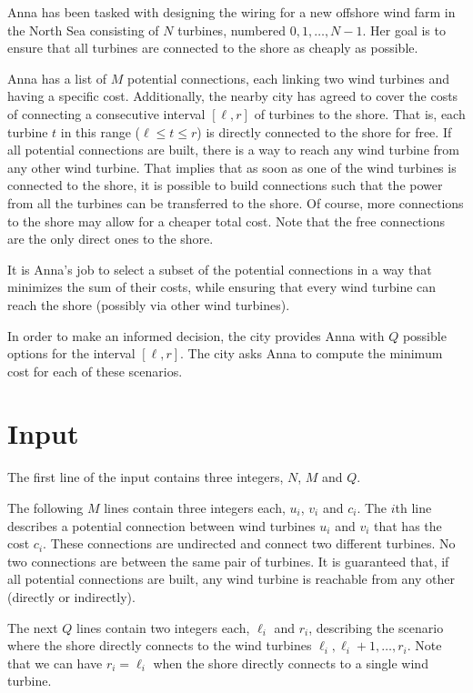 
Anna has been tasked with designing the wiring for a new offshore wind farm in the North Sea consisting of $N$ turbines, numbered $0, 1, \ldots, N-1$. Her goal is to ensure that all turbines are connected to the shore as cheaply as possible.

Anna has a list of $M$ potential connections, each linking two wind turbines and having a specific cost. Additionally, the nearby city has agreed to cover the costs of connecting a consecutive interval $[\ell, r]$ of turbines to the shore. That is, each turbine $t$ in this range ($\ell\le t\le r$) is directly connected to the shore for free. 
If all potential connections are built, there is a way to reach any wind turbine from any other wind turbine.
That implies that as soon as one of the wind turbines is connected to the shore, it is possible to build connections such that the power from all the turbines can be transferred to the shore. Of course, more connections to the shore may allow for a cheaper total cost.
Note that the free connections are the only direct ones to the shore.

It is Anna's job to select a subset of the potential connections in a way that minimizes the sum of their costs, while ensuring that every wind turbine can reach the shore (possibly via other wind turbines).

In order to make an informed decision, the city provides Anna with $Q$ possible options for the interval $[\ell, r]$. The city asks Anna to compute the minimum cost for each of these scenarios.

\section*{Input}
The first line of the input contains three integers, $N$, $M$ and $Q$.

The following $M$ lines contain three integers each, $u_i$, $v_i$ and $c_i$. The $i$th line describes a potential connection between wind turbines $u_i$ and $v_i$ that has the cost $c_i$. These connections are undirected and connect two different turbines. No two connections are between the same pair of turbines.
It is guaranteed that, if all potential connections are built, any wind turbine is reachable from any other (directly or indirectly).

The next $Q$ lines contain two integers each, $\ell_i$ and $r_i$, describing the scenario where the shore directly connects to the wind turbines $\ell_i,\ell_i+1,\ldots,r_i$. Note that we can have $r_i = \ell_i$ when the shore directly connects to a single wind turbine.

